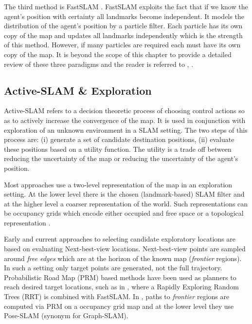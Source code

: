 \documentclass{frontiersSCNS} %
\begin{document}
The third method is FastSLAM \cite{FastSLAM}. FastSLAM exploits the fact that if we know the agent's position with 
certainty all landmarks become independent. It models the distribution of the agent's position by a particle filter. Each particle
has its own copy of the map and updates all landmarks independently which is the strength of this method. 
However, if many particles are required each must have its own copy of the map. 
It is beyond the scope of this chapter to provide a detailed review of these  three paradigms and the reader is referred to \cite{Thrun_Burgard_Fox_2005}, \cite{SLAM_HBR}.

\subsection{Active-SLAM \& Exploration}

Active-SLAM refers to a decision theoretic process of choosing control actions so as to actively 
increase the convergence of the map. It is used in conjunction with exploration of an unknown environment
in a SLAM setting. The two steps of this process are: (i) generate a set of 
candidate destination positions, (ii) evaluate these positions based on a utility function. The utility  
is a trade off between reducing the uncertainty of the map or reducing the uncertainty
of the agent's position.

Most approaches use a two-level representation of the map in an exploration setting. At the lower level
there is the chosen (landmark-based) SLAM filter and at the higher level a coarser representation of the world.
Such representations can be occupancy grids \cite{Thrun_grid_based_1996} which encode either occupied and free space
or a topological representation \cite{Kollar_2008_Exploration_SLAM}.

Early and current approaches to selecting candidate exploratory locations are based on evaluating 
Next-best-view \cite{Navigation_strategires_for_exploring_indoor_environments} locations. Next-best-view points are 
sampled around \textit{free edges} which are at the horizon of the known map (\textit{frontier} regions). 
In such a setting only target points are generated, not the full trajectory. Probabilistic Road Map (PRM) \cite{PRM_1996}
based methods have been used as planners to reach desired target locations, such as in \cite{RRT-SLAM}, where a Rapidly
Exploring Random Trees (RRT) is combined with FastSLAM. In \cite{ActivePosSLAM}, paths to \textit{frontier} regions are computed
via PRM  on a occupancy grid map and at the lower level they use Pose-SLAM (synonym for Graph-SLAM).
\end{document}
